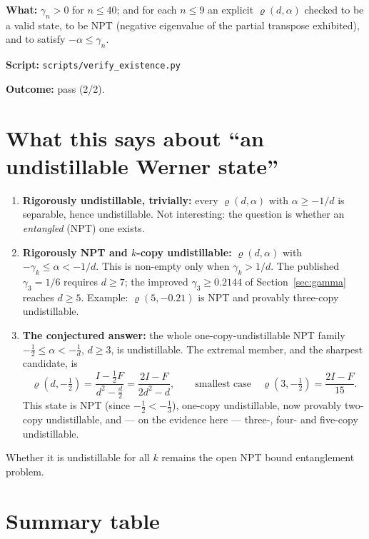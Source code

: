 \documentclass[11pt]{article}
\theoremstyle{definition}
\theoremstyle{plain}
\begin{document}
\begin{verification}
\textbf{What:} $\gamma_n>0$ for $n\le40$; and for each $n\le9$ an explicit
$\varrho(d,\alpha)$ checked to be a valid state, to be NPT (negative eigenvalue of the
partial transpose exhibited), and to satisfy $-\alpha\le\gamma_n$.

\textbf{Script:} \texttt{scripts/verify\_existence.py}

\textbf{Outcome:} pass (2/2).
\end{verification}

\section{What this says about ``an undistillable Werner state''}

\begin{enumerate}
\item \textbf{Rigorously undistillable, trivially:} every $\varrho(d,\alpha)$ with
$\alpha\ge-1/d$ is separable, hence undistillable. Not interesting: the question is
whether an \emph{entangled} (NPT) one exists.
\item \textbf{Rigorously NPT and $k$-copy undistillable:} $\varrho(d,\alpha)$ with
$-\gamma_k\le\alpha<-1/d$. This is non-empty only when $\gamma_k>1/d$. The published
$\gamma_3=1/6$ requires $d\ge7$; the improved $\gamma_3\ge0.2144$ of
Section~\ref{sec:gamma} reaches $d\ge5$. Example: $\varrho(5,-0.21)$ is NPT and provably
three-copy undistillable.
\item \textbf{The conjectured answer:} the whole one-copy-undistillable NPT family
$-\tfrac12\le\alpha<-\tfrac1d$, $d\ge3$, is undistillable. The extremal member, and the
sharpest candidate, is
\[
\varrho(d,-\tfrac12)=\frac{I-\tfrac12F}{d^2-\tfrac d2}=\frac{2I-F}{2d^2-d},
\qquad\text{smallest case}\quad \varrho(3,-\tfrac12)=\frac{2I-F}{15}.
\]
This state is NPT (since $-\tfrac12<-\tfrac13$), one-copy undistillable, now
provably two-copy undistillable, and --- on the evidence here --- three-, four- and
five-copy undistillable.
\end{enumerate}
Whether it is undistillable for all $k$ remains the open NPT bound entanglement problem.

\section{Summary table}

\end{document}
